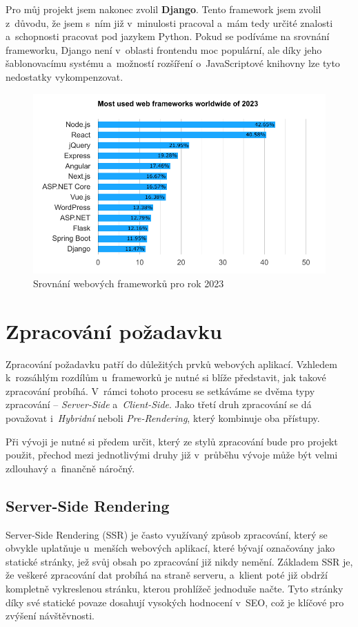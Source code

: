 Pro můj projekt jsem nakonec zvolil \textbf{Django}. Tento framework jsem zvolil z~důvodu, že jsem s~ním již v~minulosti pracoval a~mám tedy určité znalosti a~schopnosti pracovat pod jazykem Python. Pokud se podíváme na srovnání frameworku, Django není v~oblasti frontendu moc populární, ale díky jeho šablonovacímu systému a~možností rozšíření o~JavaScriptové knihovny lze tyto nedostatky vykompenzovat.

\begin{figure}[H]
    \centering
    \includegraphics{diagrams/frameworkGraphs}
    \caption{Srovnání webových frameworků pro rok 2023 \cite{framework_comparison}}
    \label{fig:framework_comparison}
\end{figure}

\section{Zpracování požadavku}
\label{sec:dev-request-processing}
Zpracování požadavku patří do důležitých prvků webových aplikací. Vzhledem k~rozsáhlým rozdílům u~frameworků je nutné si blíže představit, jak takové zpracování probíhá. V~rámci tohoto procesu se setkáváme se dvěma typy zpracování -- \textit{Server-Side} a~\textit{Client-Side}. Jako třetí druh zpracování se dá považovat i~\textit{Hybridní} neboli \textit{Pre-Rendering}, který kombinuje oba přístupy.

Při vývoji je nutné si předem určit, který ze stylů zpracování bude pro projekt použit, přechod mezi jednotlivými druhy již v~průběhu vývoje může být velmi zdlouhavý a~finančně náročný. \cite{request_processing}

\subsection{Server-Side Rendering}
\label{subsec:dev-request-processing-server-side-rendering}
Server-Side Rendering (SSR) je často využívaný způsob zpracování, který se obvykle uplatňuje u~menších webových aplikací, které bývají označovány jako statické stránky, jež svůj obsah po zpracování již nikdy nemění. Základem SSR je, že veškeré zpracování dat probíhá na straně serveru, a~klient poté již obdrží kompletně vykreslenou stránku, kterou prohlížeč jednoduše načte. Tyto stránky díky své statické povaze dosahují vysokých hodnocení v~SEO, což je klíčové pro zvýšení návštěvnosti.

